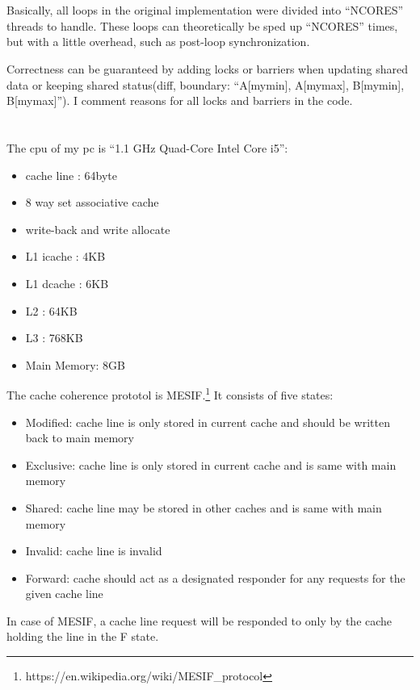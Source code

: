 \documentclass{article}
\begin{document}
\section{}


Basically, all loops in the original implementation were divided into ``NCORES'' threads to handle. These loops can theoretically be sped up ``NCORES'' times, but with a little overhead, such as post-loop synchronization.

Correctness can be guaranteed by adding locks or barriers when updating shared data or keeping shared status(diff, boundary: ``A[mymin], A[mymax], B[mymin], B[mymax]''). I comment reasons for all locks and barriers in the code.

\section{}



\section{}
The cpu of my pc is ``1.1 GHz Quad-Core Intel Core i5'':
\begin{itemize}
  \item cache line : 64byte
  \item 8 way set associative cache
  \item write-back and write allocate
  \item L1 icache  : 4KB
  \item L1 dcache  : 6KB
  \item L2         : 64KB
  \item L3         : 768KB
  \item Main Memory: 8GB
\end{itemize}
The cache coherence prototol is MESIF.\footnote{https://en.wikipedia.org/wiki/MESIF\_protocol} It consists of five states:
\begin{itemize}
  \item Modified: cache line is only stored in current cache and should be written back to main memory
  \item Exclusive: cache line is only stored in current cache and is same with main memory
  \item Shared: cache line may be stored in other caches and is same with main memory
  \item Invalid: cache line is invalid
  \item Forward: cache should act as a designated responder for any requests for the given cache line
\end{itemize}
In case of MESIF, a cache line request will be responded to only by the cache holding the line in the F state.
\end{document}
